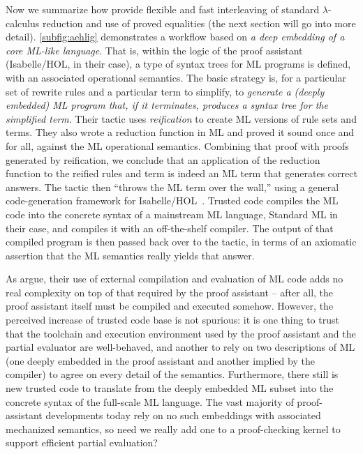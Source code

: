 Now we summarize how \textcite{Aehlig} provide flexible and fast interleaving of standard $\lambda$-calculus reduction and use of proved equalities (the next section will go into more detail).
\autoref{subfig:aehlig} demonstrates a workflow based on \emph{a deep embedding of a core ML-like language}.
That is, within the logic of the proof assistant (Isabelle/HOL, in their case), a type of syntax trees for ML programs is defined, with an associated operational semantics.
The basic strategy is, for a particular set of rewrite rules and a particular term to simplify, to \emph{generate a (deeply embedded) ML program that, if it terminates, produces a syntax tree for the simplified term}.
Their tactic uses \emph{reification} to create ML versions of rule sets and terms.
They also wrote a reduction function in ML and proved it sound once and for all, against the ML operational semantics.
Combining that proof with proofs generated by reification, we conclude that an application of the reduction function to the reified rules and term is indeed an ML term that generates correct answers.
The tactic then ``throws the ML term over the wall,'' using a general code-generation framework for Isabelle/HOL~\cite{CodeGen}.
Trusted code compiles the ML code into the concrete syntax of a mainstream ML language, Standard ML in their case, and compiles it with an off-the-shelf compiler.
The output of that compiled program is then passed back over to the tactic, in terms of an axiomatic assertion that the ML semantics really yields that answer.

As \textcite{Aehlig} argue, their use of external compilation and evaluation of ML code adds no real complexity on top of that required by the proof assistant -- after all, the proof assistant itself must be compiled and executed somehow.
However, the perceived increase of trusted code base is not spurious:
it is one thing to trust that the toolchain and execution environment used by the proof assistant and the partial evaluator are well-behaved,
and another to rely on two descriptions of ML (one deeply embedded in the proof assistant and another implied by the compiler) to agree on every detail of the semantics.
Furthermore, there still is new trusted code to translate from the deeply embedded ML subset into the concrete syntax of the full-scale ML language.
The vast majority of proof-assistant developments today rely on no such embeddings with associated mechanized semantics, so need we really add one to a proof-checking kernel to support efficient partial evaluation?

